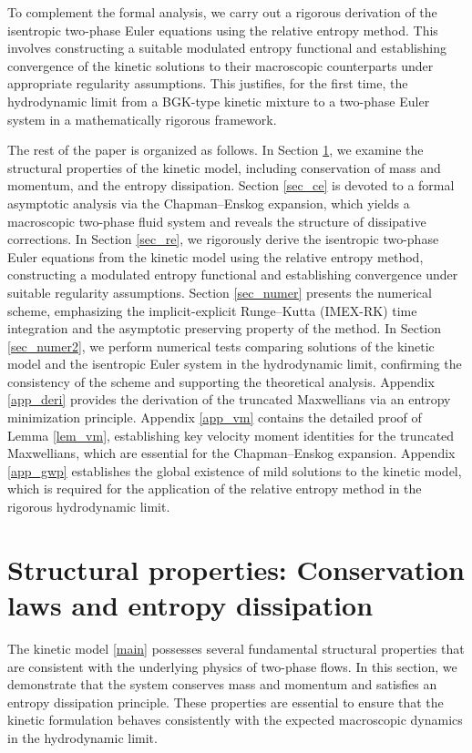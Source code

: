 \documentclass[10pt,reqno]{amsart}
\numberwithin{equation}{section}
\begin{document}
To complement the formal analysis, we carry out a rigorous derivation of the isentropic two-phase Euler equations using the relative entropy method. This involves constructing a suitable modulated entropy functional and establishing convergence of the kinetic solutions to their macroscopic counterparts under appropriate regularity assumptions. This justifies, for the first time, the hydrodynamic limit from a BGK-type kinetic mixture to a two-phase Euler system in a mathematically rigorous framework.
 
 
The rest of the paper is organized as follows. In Section \ref{sec_pre}, we examine the structural properties of the kinetic model, including conservation of mass and momentum, and the entropy dissipation. Section \ref{sec_ce} is devoted to a formal asymptotic analysis via the Chapman--Enskog expansion, which yields a macroscopic two-phase fluid system and reveals the structure of dissipative corrections. In Section \ref{sec_re}, we rigorously derive the isentropic two-phase Euler equations from the kinetic model using the relative entropy method, constructing a modulated entropy functional and establishing convergence under suitable regularity assumptions. Section \ref{sec_numer} presents the numerical scheme, emphasizing the implicit-explicit Runge--Kutta (IMEX-RK) time integration and the asymptotic preserving property of the method. In Section \ref{sec_numer2}, we perform numerical tests comparing solutions of the kinetic model and the isentropic Euler system in the hydrodynamic limit, confirming the consistency of the scheme and supporting the theoretical analysis. Appendix \ref{app_deri} provides the derivation of the truncated Maxwellians via an entropy minimization principle. Appendix \ref{app_vm} contains the detailed proof of Lemma \ref{lem_vm}, establishing key velocity moment identities for the truncated Maxwellians, which are essential for the Chapman--Enskog expansion. Appendix \ref{app_gwp} establishes the global existence of mild solutions to the kinetic model, which is required for the application of the relative entropy method in the rigorous hydrodynamic limit.

\section{Structural properties: Conservation laws and entropy dissipation}\label{sec_pre}

The kinetic model \eqref{main} possesses several fundamental structural properties that are consistent with the underlying physics of two-phase flows. In this section, we demonstrate that the system conserves mass and momentum and satisfies an entropy dissipation principle. These properties are essential to ensure that the kinetic formulation behaves consistently with the expected macroscopic dynamics in the hydrodynamic limit.
\end{document}

